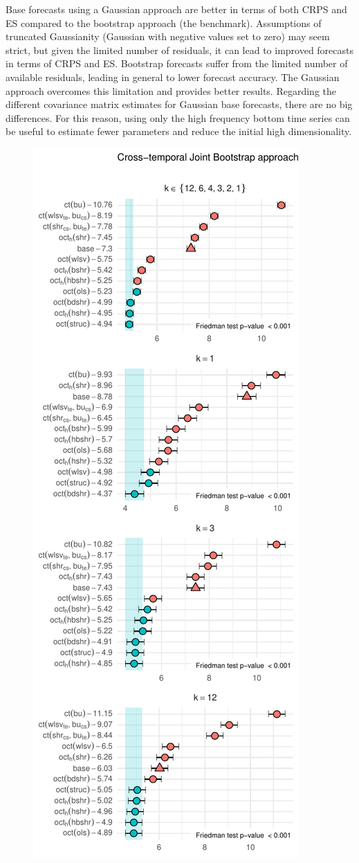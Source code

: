 \documentclass[a4paper,11pt]{article}
\theoremstyle{definition}
\begin{document}
Base forecasts using a Gaussian approach are better in terms of both CRPS and ES compared to the bootstrap approach (the benchmark). Assumptions of truncated Gaussianity (Gaussian with negative values set to zero) may seem strict, but given the limited number of residuals, it can lead to improved forecasts in terms of CRPS and ES. Bootstrap forecasts suffer from the limited number of available residuals, leading in general to lower forecast accuracy. The Gaussian approach overcomes this limitation and provides better results. Regarding the different covariance matrix estimates for Gaussian base forecasts, there are no big differences. For this reason, using only the high frequency bottom time series can be useful to estimate fewer parameters and reduce the initial high dimensionality.

\begin{figure}[p]
	\centering
	\includegraphics[width = 0.45\linewidth]{fig/VN525/ctjb_part.pdf}

\end{figure}
\end{document}
